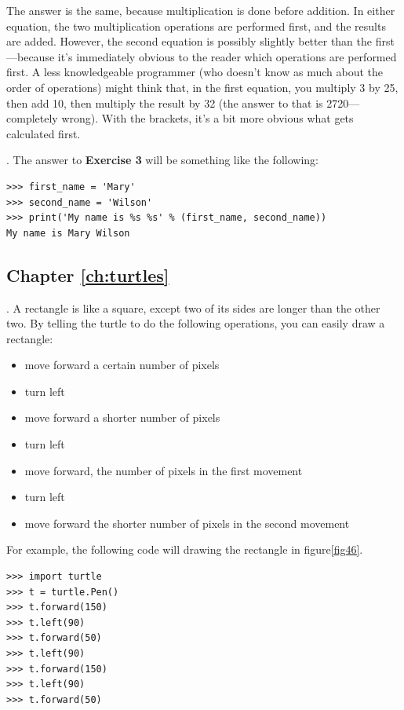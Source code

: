 \noindent
The answer is the same, because multiplication is done before addition.  In either equation, the two multiplication operations are performed first, and the results are added.  However, the second equation is possibly slightly better than the first---because it's immediately obvious to the reader which operations are performed first.  A less knowledgeable programmer (who doesn't know as much about the order of operations) might think that, in the first equation, you multiply 3 by 25, then add 10, then multiply the result by 32 (the answer to that is 2720---completely wrong).  With the brackets, it's a bit more obvious what gets calculated first.

.  The answer to \textbf{Exercise 3} will be something like the following:

\begin{listing}
\begin{verbatim}
>>> first_name = 'Mary'
>>> second_name = 'Wilson'
>>> print('My name is %s %s' % (first_name, second_name))
My name is Mary Wilson
\end{verbatim}
\end{listing}

\subsection*{Chapter \ref{ch:turtles}}

. A rectangle is like a square, except two of its sides are longer than the other two.  By telling the turtle to do the following operations, you can easily draw a rectangle:

\begin{itemize}
 \item move forward a certain number of pixels
 \item turn left
 \item move forward a shorter number of pixels
 \item turn left
 \item move forward, the number of pixels in the first movement
 \item turn left
 \item move forward the shorter number of pixels in the second movement
\end{itemize}

\noindent
For example, the following code will drawing the rectangle in figure\ref{fig46}.

\begin{listing}
\begin{verbatim}
>>> import turtle
>>> t = turtle.Pen()
>>> t.forward(150)
>>> t.left(90)
>>> t.forward(50)
>>> t.left(90)
>>> t.forward(150)
>>> t.left(90)
>>> t.forward(50)
\end{verbatim}
\end{listing}

